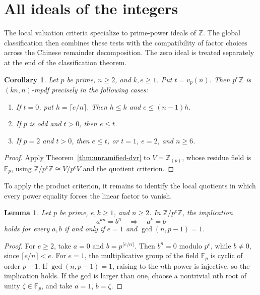 \documentclass[11pt,a4paper]{amsart}
\newtheorem{lemma}[theorem]{Lemma}
\newtheorem{corollary}[theorem]{Corollary}
\theoremstyle{definition}
\theoremstyle{remark}
\numberwithin{equation}{section}
\begin{document}
\section{All ideals of the integers}\label{sec:integers}

The local valuation criteria specialize to prime-power ideals of
$\mathbb Z$. The global classification then combines these tests with
the compatibility of factor choices across the Chinese remainder
decomposition. The zero ideal is treated separately at the end of the
classification theorem.

\begin{corollary}\label{thm:integer-pp}
Let $p$ be prime, $n\ge2$, and $k,e\ge1$. Put $t=v_p(n)$.
Then $p^e\mathbb Z$ is $(kn,n)$-mpdf precisely in the following cases:
\begin{enumerate}
\item If $t=0$, put $h=\lceil e/n\rceil$. Then $h\le k$ and
$e\le(n-1)h$.
\item If $p$ is odd and $t>0$, then $e\le t$.
\item If $p=2$ and $t>0$, then $e\le t$, or
$t=1$, $e=2$, and $n\ge6$.
\end{enumerate}
\end{corollary}
\begin{proof}
Apply Theorem~\ref{thm:unramified-dvr} to $V=\mathbb Z_{(p)}$, whose
residue field is $\mathbb F_p$, using
$\mathbb Z/p^e\mathbb Z\cong V/p^eV$ and the quotient criterion.
\end{proof}


To apply the product criterion, it remains to identify the local
quotients in which every power equality forces the linear factor to vanish.

\begin{lemma}\label{lem:integer-linear}
Let $p$ be prime, $e,k\ge1$, and $n\ge2$. In $\mathbb Z/p^e\mathbb Z$,
the implication
\[
 a^{kn}=b^n\quad\Longrightarrow\quad a^k=b
\]
holds for every $a,b$ if and only if $e=1$ and $\gcd(n,p-1)=1$.
\end{lemma}
\begin{proof}
For $e\ge2$, take $a=0$ and $b=p^{\lceil e/n\rceil}$.
Then $b^n=0$ modulo $p^e$, while $b\ne0$, since
$\lceil e/n\rceil<e$.
For $e=1$, the multiplicative group of the field $\mathbb F_p$ is cyclic
of order $p-1$. If $\gcd(n,p-1)=1$, raising to the $n$th power is injective,
so the implication holds. If the gcd is larger than one, choose a
nontrivial $n$th root of unity $\zeta\in\mathbb F_p$, and take
$a=1$, $b=\zeta$.
\end{proof}
\end{document}
